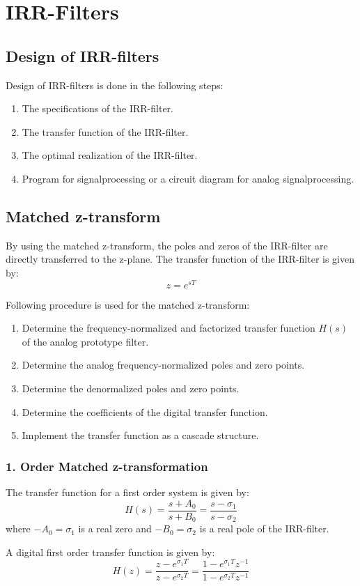 \section{IRR-Filters}
\subsection{Design of IRR-filters}
Design of IRR-filters is done in the following steps:
\begin{enumerate}
  \item The specifications of the IRR-filter.
  \item The transfer function of the IRR-filter.
  \item The optimal realization of the IRR-filter.
  \item Program for signalprocessing or a circuit diagram for analog
    signalprocessing.
\end{enumerate}
\subsection{Matched z-transform}
By using the matched z-transform, the poles and zeros of the IRR-filter are directly transferred to the z-plane. The transfer function of the IRR-filter is given by:
$$z=e^{sT}$$

Following procedure is used for the matched z-transform:
\begin{enumerate}
  \item Determine the frequency-normalized and factorized transfer function $H(s)$ of the analog prototype filter.
  \item Determine the analog frequency-normalized poles and zero points.
  \item Determine the denormalized poles and zero points.
  \item Determine the coefficients of the digital transfer function.
  \item Implement the transfer function as a cascade structure.
\end{enumerate}
\subsubsection{1. Order Matched z-transformation}
The transfer function for a first order system is given by:
$$H(s)={\frac{s+A_{0}}{s+B_{0}}}={\frac{s-\sigma_{1}}{s-\sigma_{2}}}$$
where $-A_{0}=\sigma_1$ is a real zero and $-B_{0}=\sigma_2$ is a real pole of the IRR-filter.

A digital first order transfer function is given by:
$$H(z)={\frac{z-e^{\sigma_1 T}}{z-e^{\sigma_2 T}}}=\frac{1-e^{\sigma_1 T}z^{-1}}{1-e^{\sigma_2 T}z^{-1}}$$

